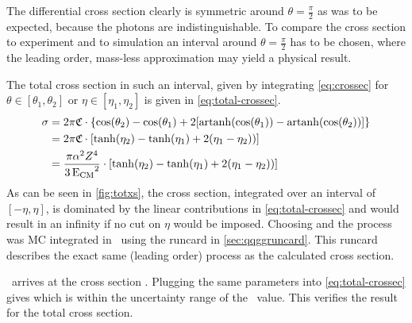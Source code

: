 The differential cross section clearly is symmetric around
\(\theta=\frac{\pi}{2}\) as was to be expected, because the photons
are indistinguishable. To compare the cross section to experiment and
to simulation an interval around \(\theta=\frac{\pi}{2}\) has to be
chosen, where the leading order, mass-less approximation may yield a
physical result.

The total cross section in such an interval, given by
integrating \cref{eq:crossec} for \(\theta\in [\theta_1, \theta_2]\)
or \(\eta\in [\eta_1, \eta_2]\) is given
in \cref{eq:total-crossec}.
%
\begin{equation}
  \label{eq:total-crossec}
  \begin{split}
  \sigma &=
  2\pi\mathfrak{C}\cdot\qty{\cos(\theta_2)-\cos(\theta_1)+2\qty[\operatorname{artanh}(\cos(\theta_1))
    - \operatorname{artanh}(\cos(\theta_2))]} \\
  &=2\pi\mathfrak{C}\cdot\qty[\tanh(\eta_2) - \tanh(\eta_1) + 2(\eta_1
  - \eta_2))] \\
  &={\frac{\pi\alpha^2Z^4}{3\operatorname{E_{\text{CM}}}^2}}\cdot\qty[\tanh(\eta_2) - \tanh(\eta_1) + 2(\eta_1
  - \eta_2))]
  \end{split}
\end{equation}
%
As can be seen in \cref{fig:totxs}, the cross section, integrated over
an interval of \([-\eta, \eta]\), is dominated by the linear
contributions in \cref{eq:total-crossec} and would result in an
infinity if no cut on \(\eta\) would be imposed. Choosing
 and  the
process was MC integrated in \sherpa\ using the runcard in
\cref{sec:qqggruncard}. This runcard describes the exact same (leading
order) process as the calculated cross section.

\sherpa\ arrives at the cross section
. Plugging the same parameters into
\cref{eq:total-crossec} gives  which is within
the uncertainty range of the \sherpa\ value. This verifies the result
for the total cross section.

